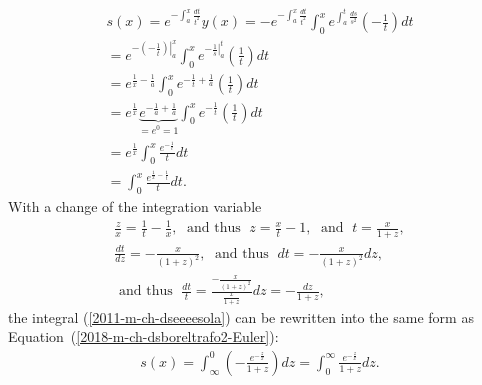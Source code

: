 \begin{equation}
\begin{split}
s(x) =   e^{ - \int_a^x \frac{ dt}{t^2}}  y(x)=
-  e^{ - \int_a^x \frac{ dt}{t^2}} \int_0^x e^{ \int_a^t \frac{ ds}{s^2}} \left(-\frac{ 1}{t}\right) dt
\\
=
  e^{ - \left. \left(-\frac{1}{t}\right )\right|_a^x} \int_0^x e^{  \left. -\frac{1}{s}\right|_a^t} \left(\frac{ 1}{t}\right) dt
\\
=
  e^{ \frac{1}{x} -  \frac{1}{a} } \int_0^x e^{  -\frac{1}{t} +  \frac{1}{a} } \left(\frac{ 1}{t}\right) dt
\\
=
  e^{ \frac{1}{x}}\underbrace{e^{ -  \frac{1}{a} + \frac{1}{a}}}_{=e^0=1} \int_0^x e^{ -\frac{1}{t} } \left(\frac{ 1}{t}\right) dt
\\
=
e^{   \frac{1}{x}} \int_0^x  \frac{ e^{ - \frac{1}{t}}}{t} dt
\\
=
 \int_0^x  \frac{ e^{ \frac{1}{x} -\frac{1}{t}}}{t} dt.
\end{split}
\label{2011-m-ch-dseeeesola}
\end{equation}
With a change of the integration variable
\begin{equation}
\begin{split}
\frac{ z }{x} = \frac{1}{t}-\frac{1}{x}
, \; \textrm{ and thus }  \;
 z  = \frac{x}{t}-1
, \;  \textrm{ and } \;
t =  \frac{x}{1+  z }
, \\
\frac{dt}{d z  } =  -\frac{x}{(1+  z )^2}  , \;
\textrm{ and thus }  \;
dt =  -\frac{x}{(1+  z )^2} d z , \;    \\
\textrm{ and thus }  \;
\frac{dt}{t } =   \frac{-\frac{x}{(1+  z )^2}}{\frac{x}{1+  z }} d z
=   -\frac{ d z }{1+  z },
\end{split}
\label{2011-m-ch-dseeans}
\end{equation}
the integral (\ref{2011-m-ch-dseeeesola}) can be rewritten into the same form as Equation~(\ref{2018-m-ch-dsboreltrafo2-Euler}):
\begin{equation}
\begin{split}
s(x)= \int_{\infty}^0
\left(-\frac{e^{-\frac{ z }{x}}}{1+ z }\right) d z
= \int_0^\infty
\frac{e^{-\frac{ z }{x}}}{1+ z } d z  .
\end{split}
\label{2011-m-ch-dseefasol}
\end{equation}

